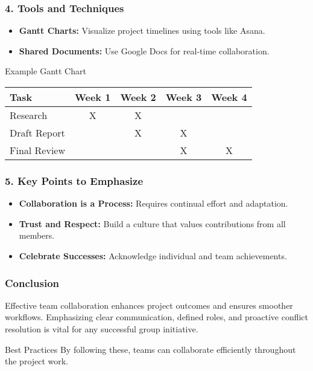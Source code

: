 \documentclass[aspectratio=169]{beamer}
\begin{document}
\begin{frame}[fragile]
    \frametitle{4. Tools and Techniques}
    \begin{itemize}
        \item \textbf{Gantt Charts:} Visualize project timelines using tools like Asana.
        \item \textbf{Shared Documents:} Use Google Docs for real-time collaboration.
    \end{itemize}
    
    \begin{block}{Example Gantt Chart}
        \begin{tabular}{|l|c|c|c|c|}
            \hline
            Task                & Week 1 & Week 2 & Week 3 & Week 4 \\
            \hline
            Research            &   X    &   X    &         &        \\
            Draft Report        &        &   X    &   X    &        \\
            Final Review        &        &         &   X    &   X    \\
            \hline
        \end{tabular}
    \end{block}
\end{frame}

\begin{frame}[fragile]
    \frametitle{5. Key Points to Emphasize}
    \begin{itemize}
        \item \textbf{Collaboration is a Process:} Requires continual effort and adaptation.
        \item \textbf{Trust and Respect:} Build a culture that values contributions from all members.
        \item \textbf{Celebrate Successes:} Acknowledge individual and team achievements.
    \end{itemize}
\end{frame}

\begin{frame}[fragile]
    \frametitle{Conclusion}
    Effective team collaboration enhances project outcomes and ensures smoother workflows. Emphasizing clear communication, defined roles, and proactive conflict resolution is vital for any successful group initiative.
    
    \begin{block}{Best Practices}
        By following these, teams can collaborate efficiently throughout the project work.
    \end{block}
\end{frame}
\end{document}
